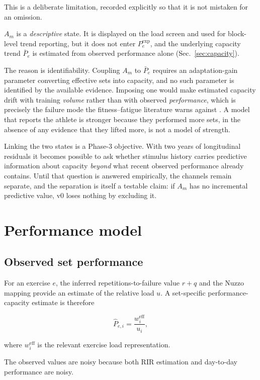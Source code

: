 \documentclass[11pt]{article}
\begin{document}
This is a deliberate limitation, recorded explicitly so that it is not mistaken for an omission.

$A_m$ is a \emph{descriptive} state. It is displayed on the load screen and used for block-level trend reporting, but it does not enter $P_e^{\mathrm{exp}}$, and the underlying capacity trend $\bar P_e$ is estimated from observed performance alone (Sec.~\ref{sec:capacity}).

The reason is identifiability. Coupling $A_m$ to $\bar P_e$ requires an adaptation-gain parameter converting effective sets into capacity, and no such parameter is identified by the available evidence. Imposing one would make estimated capacity drift with training \emph{volume} rather than with observed \emph{performance}, which is precisely the failure mode the fitness--fatigue literature warns against \cite{imbach2022}. A model that reports the athlete is stronger because they performed more sets, in the absence of any evidence that they lifted more, is not a model of strength.

Linking the two states is a Phase-3 objective. With two years of longitudinal residuals it becomes possible to ask whether stimulus history carries predictive information about capacity \emph{beyond} what recent observed performance already contains. Until that question is answered empirically, the channels remain separate, and the separation is itself a testable claim: if $A_m$ has no incremental predictive value, v0 loses nothing by excluding it.

\section{Performance model}

\subsection{Observed set performance}

For an exercise $e$, the inferred repetitions-to-failure value $r+q$ and the Nuzzo mapping provide an estimate of the relative load $u$. A set-specific performance-capacity estimate is therefore

\begin{equation}
\widehat{P}_{e,i}=\frac{w_i^{\mathrm{eff}}}{u_i},
\end{equation}

where $w_i^{\mathrm{eff}}$ is the relevant exercise load representation.

The observed values are noisy because both RIR estimation and day-to-day performance are noisy.
\end{document}
